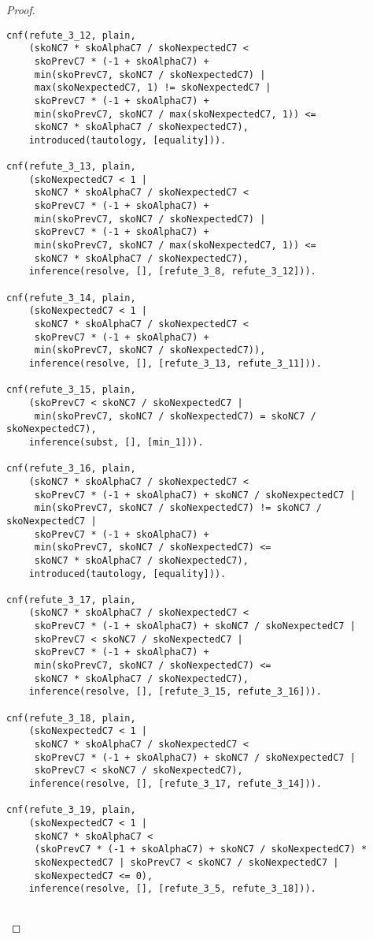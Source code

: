 \begin{proof}
\begin{verbatim}
cnf(refute_3_12, plain,
    (skoNC7 * skoAlphaC7 / skoNexpectedC7 <
     skoPrevC7 * (-1 + skoAlphaC7) +
     min(skoPrevC7, skoNC7 / skoNexpectedC7) |
     max(skoNexpectedC7, 1) != skoNexpectedC7 |
     skoPrevC7 * (-1 + skoAlphaC7) +
     min(skoPrevC7, skoNC7 / max(skoNexpectedC7, 1)) <=
     skoNC7 * skoAlphaC7 / skoNexpectedC7),
    introduced(tautology, [equality])).

cnf(refute_3_13, plain,
    (skoNexpectedC7 < 1 |
     skoNC7 * skoAlphaC7 / skoNexpectedC7 <
     skoPrevC7 * (-1 + skoAlphaC7) +
     min(skoPrevC7, skoNC7 / skoNexpectedC7) |
     skoPrevC7 * (-1 + skoAlphaC7) +
     min(skoPrevC7, skoNC7 / max(skoNexpectedC7, 1)) <=
     skoNC7 * skoAlphaC7 / skoNexpectedC7),
    inference(resolve, [], [refute_3_8, refute_3_12])).

cnf(refute_3_14, plain,
    (skoNexpectedC7 < 1 |
     skoNC7 * skoAlphaC7 / skoNexpectedC7 <
     skoPrevC7 * (-1 + skoAlphaC7) +
     min(skoPrevC7, skoNC7 / skoNexpectedC7)),
    inference(resolve, [], [refute_3_13, refute_3_11])).

cnf(refute_3_15, plain,
    (skoPrevC7 < skoNC7 / skoNexpectedC7 |
     min(skoPrevC7, skoNC7 / skoNexpectedC7) = skoNC7 / skoNexpectedC7),
    inference(subst, [], [min_1])).

cnf(refute_3_16, plain,
    (skoNC7 * skoAlphaC7 / skoNexpectedC7 <
     skoPrevC7 * (-1 + skoAlphaC7) + skoNC7 / skoNexpectedC7 |
     min(skoPrevC7, skoNC7 / skoNexpectedC7) != skoNC7 / skoNexpectedC7 |
     skoPrevC7 * (-1 + skoAlphaC7) +
     min(skoPrevC7, skoNC7 / skoNexpectedC7) <=
     skoNC7 * skoAlphaC7 / skoNexpectedC7),
    introduced(tautology, [equality])).

cnf(refute_3_17, plain,
    (skoNC7 * skoAlphaC7 / skoNexpectedC7 <
     skoPrevC7 * (-1 + skoAlphaC7) + skoNC7 / skoNexpectedC7 |
     skoPrevC7 < skoNC7 / skoNexpectedC7 |
     skoPrevC7 * (-1 + skoAlphaC7) +
     min(skoPrevC7, skoNC7 / skoNexpectedC7) <=
     skoNC7 * skoAlphaC7 / skoNexpectedC7),
    inference(resolve, [], [refute_3_15, refute_3_16])).

cnf(refute_3_18, plain,
    (skoNexpectedC7 < 1 |
     skoNC7 * skoAlphaC7 / skoNexpectedC7 <
     skoPrevC7 * (-1 + skoAlphaC7) + skoNC7 / skoNexpectedC7 |
     skoPrevC7 < skoNC7 / skoNexpectedC7),
    inference(resolve, [], [refute_3_17, refute_3_14])).

cnf(refute_3_19, plain,
    (skoNexpectedC7 < 1 |
     skoNC7 * skoAlphaC7 <
     (skoPrevC7 * (-1 + skoAlphaC7) + skoNC7 / skoNexpectedC7) *
     skoNexpectedC7 | skoPrevC7 < skoNC7 / skoNexpectedC7 |
     skoNexpectedC7 <= 0),
    inference(resolve, [], [refute_3_5, refute_3_18])).


\end{verbatim}
\end{proof}

